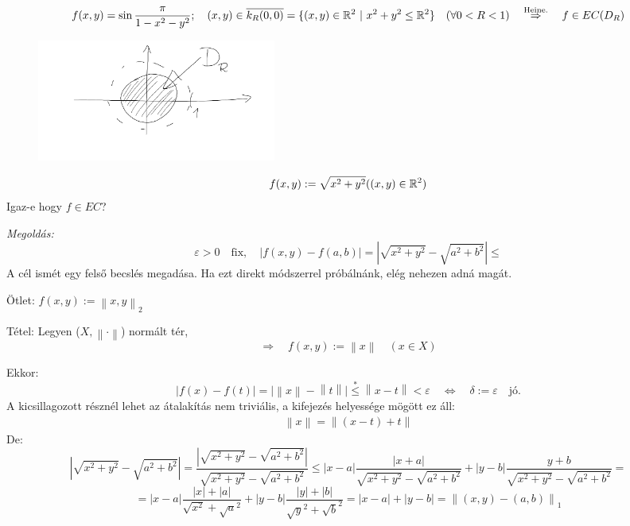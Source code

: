 \documentclass[a4paper,11.5pt]{article}
\newcommand{\norm}[1]{\left\lVert#1\right\rVert}
\begin{document}
	\begin{note}
		\[ f(x,y)=\sin\frac{\pi}{1-x^2-y^2};\quad (x,y)\in\overline{k_R(0,0)}=\{ (x,y)\in\mathbb{R}^2\ | \ x^2+y^2\leq \mathbb{R}^2 \}\quad (\forall 0<R<1)\quad \overset{\text{Heine.}}{\Rightarrow}\quad f\in EC(D_R) \]
		\begin{figure}[H]
			\centering
			\includegraphics[height=4cm]{../2zh/kepek/55.png}
			\caption{}
		\end{figure}
	\end{note}
	\begin{task}
		\[ f(x,y):=\sqrt{x^2+y^2}((x,y)\in\mathbb{R}^2) \]
		Igaz-e hogy $f\in EC$?
		
		\textit{Megoldás:} 
		\[ \varepsilon>0\quad \text{fix},\quad |f(x,y)-f(a,b)|=|\sqrt{x^2+y^2}-\sqrt{a^2+b^2}|\leq \]
		A cél ismét egy felső becslés megadása. Ha ezt direkt módszerrel próbálnánk, elég nehezen adná magát.
		
		Ötlet: $f(x,y):=\norm{x,y}_2$
		
		Tétel: Legyen ($X,\norm{\cdot}$) normált tér,
		\[ \Rightarrow\quad f(x,y):=\norm{x}\quad (x\in X) \]
		
		Ekkor:
		\[ |f(x)-f(t)|=\big|\norm{x}-\norm{t}\big|\overset{*}{\leq}\norm{x-t}<\varepsilon\quad \Leftrightarrow\quad \delta:=\varepsilon\quad \text{jó.} \]
		A kicsillagozott résznél lehet az átalakítás nem triviális, a kifejezés helyessége mögött ez áll:
		\begin{align}
			\norm{x}=\norm{(x-t)+t}
		\end{align}
		De:
		\[ \left|\sqrt{x^2+y^2}-\sqrt{a^2+b^2}\right|=\frac{\left|\sqrt{x^2+y^2}-\sqrt{a^2+b^2}\right|}{\sqrt{x^2+y^2}-\sqrt{a^2+b^2}}\leq|x-a|\frac{|x+a|}{\sqrt{x^2+y^2}-\sqrt{a^2+b^2}}+|y-b|\frac{y+b}{\sqrt{x^2+y^2}-\sqrt{a^2+b^2}}= \]
		\[ = |x-a|\frac{|x|+|a|}{\sqrt{x^2}+\sqrt{a}^2}+|y-b|\frac{|y|+|b|}{\sqrt{y}^2+\sqrt{b}^2}=|x-a|+|y-b|=\norm{(x,y)-(a,b)}_1 \] 
	\end{task}
\end{document}
